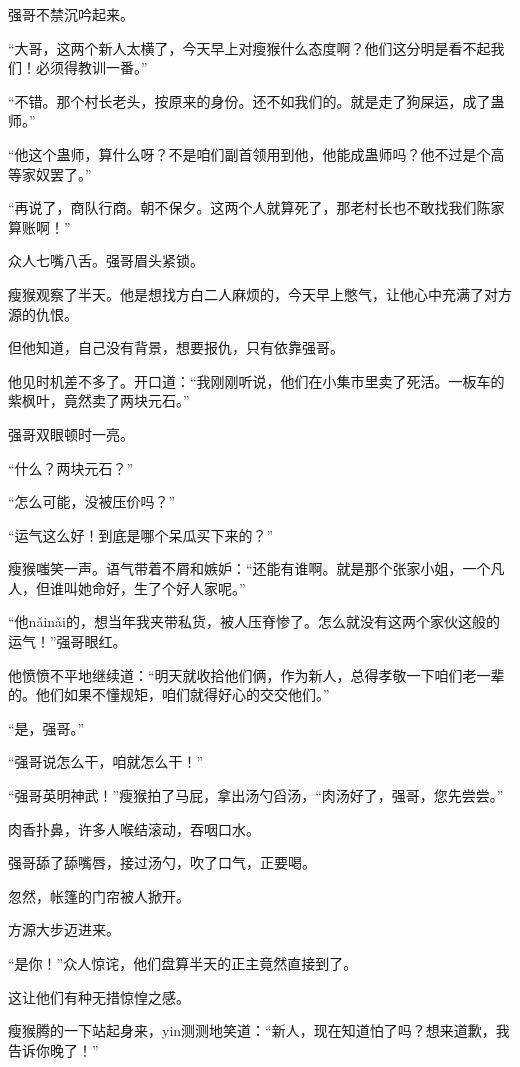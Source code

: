 \begin{this_body}
强哥不禁沉吟起来。

“大哥，这两个新人太横了，今天早上对瘦猴什么态度啊？他们这分明是看不起我们！必须得教训一番。”

“不错。那个村长老头，按原来的身份。还不如我们的。就是走了狗屎运，成了蛊师。”

“他这个蛊师，算什么呀？不是咱们副首领用到他，他能成蛊师吗？他不过是个高等家奴罢了。”

“再说了，商队行商。朝不保夕。这两个人就算死了，那老村长也不敢找我们陈家算账啊！”

众人七嘴八舌。强哥眉头紧锁。

瘦猴观察了半天。他是想找方白二人麻烦的，今天早上憋气，让他心中充满了对方源的仇恨。

但他知道，自己没有背景，想要报仇，只有依靠强哥。

他见时机差不多了。开口道：“我刚刚听说，他们在小集市里卖了死活。一板车的紫枫叶，竟然卖了两块元石。”

强哥双眼顿时一亮。

“什么？两块元石？”

“怎么可能，没被压价吗？”

“运气这么好！到底是哪个呆瓜买下来的？”

瘦猴嗤笑一声。语气带着不屑和嫉妒：“还能有谁啊。就是那个张家小姐，一个凡人，但谁叫她命好，生了个好人家呢。”

“他nǎinǎi的，想当年我夹带私货，被人压脊惨了。怎么就没有这两个家伙这般的运气！”强哥眼红。

他愤愤不平地继续道：“明天就收拾他们俩，作为新人，总得孝敬一下咱们老一辈的。他们如果不懂规矩，咱们就得好心的交交他们。”

“是，强哥。”

“强哥说怎么干，咱就怎么干！”

“强哥英明神武！”瘦猴拍了马屁，拿出汤勺舀汤，“肉汤好了，强哥，您先尝尝。”

肉香扑鼻，许多人喉结滚动，吞咽口水。

强哥舔了舔嘴唇，接过汤勺，吹了口气，正要喝。

忽然，帐篷的门帘被人掀开。

方源大步迈进来。

“是你！”众人惊诧，他们盘算半天的正主竟然直接到了。

这让他们有种无措惊惶之感。

瘦猴腾的一下站起身来，yin测测地笑道：“新人，现在知道怕了吗？想来道歉，我告诉你晚了！”


\end{this_body}
